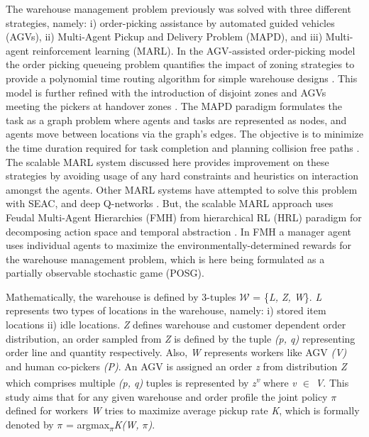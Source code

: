 \documentclass{article}
\begin{document}
The warehouse management problem previously was solved with three different  strategies, namely: i) order-picking assistance by automated guided vehicles (AGVs), ii) Multi-Agent Pickup and Delivery Problem (MAPD), and iii) Multi-agent reinforcement learning (MARL).
In the AGV-assisted order-picking model the order picking queueing problem quantifies the impact of zoning strategies to provide a polynomial time routing algorithm for simple warehouse designs \cite{azadeh2020dynamic}.
This model is further refined with the introduction of disjoint zones and AGVs meeting the pickers at handover zones \cite{vzulj2022order}.
The MAPD paradigm formulates the task as a graph problem where agents and tasks are represented as nodes, and agents move between locations via the graph’s edges.
The objective is to minimize the time duration required for task completion and planning collision free paths \cite{xu2022multi, ma2019lifelong}.
The scalable MARL system discussed here provides improvement on these strategies by avoiding usage of any hard constraints and heuristics on interaction amongst the agents.
Other MARL systems have attempted to solve this problem with SEAC, and deep Q-networks \cite{christianos2020shared, kim2020sortation}.
But, the scalable MARL approach uses Feudal Multi-Agent Hierarchies (FMH) from hierarchical RL (HRL) paradigm for decomposing action space and temporal abstraction \cite{dayan1992feudal, barto2003recent}.
In FMH a manager agent uses individual agents to maximize the environmentally-determined rewards for the warehouse management problem, which is here being formulated as a partially observable stochastic game (POSG).


Mathematically, the warehouse is defined by 3-tuples $\mathcal{W}$ = \{\textit{L, Z, W}\}. \textit{L} represents two types of locations in the warehouse, namely: i) stored item locations ii) idle locations.
\textit{Z} defines warehouse and customer dependent order distribution, an order sampled from \textit{Z} is defined by the tuple \textit{(p, q)} representing order line and quantity respectively.
Also, \textit{W} represents workers like AGV \textit{(V)} and human co-pickers \textit{(P)}.
An AGV is assigned an order \textit{z} from distribution \textit{Z} which comprises multiple \textit{(p, q)} tuples is represented by \textit{z\textsuperscript{v}} where \textit{v $\in$ V}.
This study aims that for any given warehouse and order profile the joint policy $\pi$ defined for workers \textit{W} tries to maximize average pickup rate \textit{K}, which is formally denoted by $\pi$ = argmax\textsubscript{$\pi$}\textit{K(W, $\pi$)}.
\end{document}
